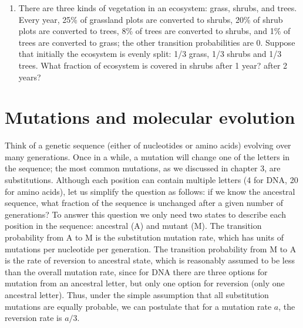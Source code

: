 \documentclass[
  letterpaper,
  DIV=11,
  numbers=noendperiod]{scrreprt}
\begin{document}
\begin{enumerate}
  (from C to O) and 0.02 (from O to C); the other transition
  probabilities are 0. Suppose that initially 3/4 of ion channels are in
  R and 1/4 are in C. What fraction of the ion channels is open after 1
  microsecond? After 2 microseconds?
\item
  There are three kinds of vegetation in an ecosystem: grass, shrubs,
  and trees. Every year, 25\% of grassland plots are converted to
  shrubs, 20\% of shrub plots are converted to trees, 8\% of trees are
  converted to shrubs, and 1\% of trees are converted to grass; the
  other transition probabilities are 0. Suppose that initially the
  ecosystem is evenly split: 1/3 grass, 1/3 shrubs and 1/3 trees. What
  fraction of ecosystem is covered in shrubs after 1 year? after 2
  years?
\end{enumerate}

\hypertarget{mutations-and-molecular-evolution}{%
\section{Mutations and molecular
evolution}\label{mutations-and-molecular-evolution}}

Think of a genetic sequence (either of nucleotides or amino acids)
evolving over many generations. Once in a while, a mutation will change
one of the letters in the sequence; the most common mutations, as we
discussed in chapter 3, are substitutions. Although each position can
contain multiple letters (4 for DNA, 20 for amino acids), let us
simplify the question as follows: if we know the ancestral sequence,
what fraction of the sequence is unchanged after a given number of
generations? To answer this question we only need two states to describe
each position in the sequence: ancestral (A) and mutant (M). The
transition probability from A to M is the substitution mutation rate,
which has units of mutations per nucleotide per generation. The
transition probability from M to A is the rate of reversion to ancestral
state, which is reasonably assumed to be less than the overall mutation
rate, since for DNA there are three options for mutation from an
ancestral letter, but only one option for reversion (only one ancestral
letter). Thus, under the simple assumption that all substitution
mutations are equally probable, we can postulate that for a mutation
rate \(a\), the reversion rate is \(a/3\).
\end{document}
